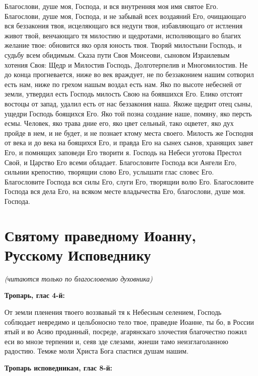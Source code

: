 Благослови, душе моя, Господа, и вся внутренняя моя имя святое Его. Благослови, душе моя, Господа, и не забывай всех воздаяний Его, очищающаго вся беззакония твоя, исцеляющаго вся недуги твоя, избавляющаго от истления живот твой, венчающаго тя милостию и щедротами, исполняющаго во благих желание твое: обновится яко орля юность твоя. Творяй милостыни Господь, и судьбу всем обидимым. Сказа пути Своя Моисеови, сыновом Израилевым хотения Своя: Щедр и Милостив Господь, Долготерпелив и Многомилостив. Не до конца прогневается, ниже во век враждует, не по беззаконием нашим сотворил есть нам, ниже по грехом нашым воздал есть нам. Яко по высоте небесней от земли, утвердил есть Господь милость Свою на боявшихся Его. Елико отстоят востоцы от запад, удалил есть от нас беззакония наша. Якоже щедрит отец сыны, ущедри Господь боящихся Его. Яко той позна создание наше, помяну, яко персть есмы. Человек, яко трава дние его, яко цвет сельный, тако оцветет, яко дух пройде в нем, и не будет, и не познает ктому места своего. Милость же Господня от века и до века на боящихся Его, и правда Его на сынех сынов, хранящих завет Его, и помнящих заповеди Его творити я. Господь на Небеси уготова Престол Свой, и Царство Его всеми обладает. Благословите Господа вси Ангели Его, сильнии крепостию, творящии слово Его, услышати глас словес Его. Благословите Господа вся силы Его, слуги Его, творящии волю Его. Благословите Господа вся дела Его, на всяком месте владычества Его, благослови, душе моя. Господа.


\section{Святому праведному Иоанну, Русскому Исповеднику}
 


\itshape (читаются только по благословению духовника)\normalfont{}


\medskip


\bfseries Тропарь, глас 4-й:\normalfont{}


От земли пленения твоего воззвавый тя к Небесным селением, Господь соблюдает невредимо и цельбоносно тело твое, праведне Иоанне, ты бо, в России ятый и во Асию проданный, посреде, агарянскаго злочестия благочестно пожил еси во мнозе терпении и, сеяв зде слезами, жнеши тамо неизглаголанною радостию. Темже моли Христа Бога спастися душам нашим.


\medskip


\bfseries Тропарь исповедникам, глас 8-й:\normalfont{}


